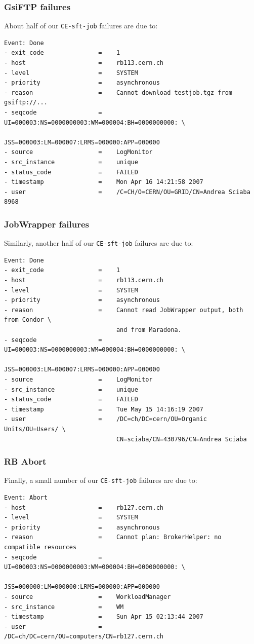 \documentclass{beamer}
\begin{document}
\begin{frame}[fragile]
\frametitle{GsiFTP failures}
About half of our {\tt CE-sft-job} failures are due to:
\scriptsize
\begin{verbatim}
Event: Done
- exit_code               =    1
- host                    =    rb113.cern.ch
- level                   =    SYSTEM
- priority                =    asynchronous
- reason                  =    Cannot download testjob.tgz from gsiftp://...
- seqcode                 =    UI=000003:NS=0000000003:WM=000004:BH=0000000000: \
                               JSS=000003:LM=000007:LRMS=000000:APP=000000
- source                  =    LogMonitor
- src_instance            =    unique
- status_code             =    FAILED
- timestamp               =    Mon Apr 16 14:21:58 2007
- user                    =    /C=CH/O=CERN/OU=GRID/CN=Andrea Sciaba 8968
\end{verbatim}
\end{frame}

\begin{frame}[fragile]
\frametitle{JobWrapper failures}
Similarly, another half of our {\tt CE-sft-job} failures are due to:
\scriptsize
\begin{verbatim}
Event: Done
- exit_code               =    1
- host                    =    rb113.cern.ch
- level                   =    SYSTEM
- priority                =    asynchronous
- reason                  =    Cannot read JobWrapper output, both from Condor \
                               and from Maradona.
- seqcode                 =    UI=000003:NS=0000000003:WM=000004:BH=0000000000: \
                               JSS=000003:LM=000007:LRMS=000000:APP=000000
- source                  =    LogMonitor
- src_instance            =    unique
- status_code             =    FAILED
- timestamp               =    Tue May 15 14:16:19 2007
- user                    =    /DC=ch/DC=cern/OU=Organic Units/OU=Users/ \
                               CN=sciaba/CN=430796/CN=Andrea Sciaba
\end{verbatim}
\end{frame}

\begin{frame}[fragile]
\frametitle{RB Abort}
Finally, a small number of our {\tt CE-sft-job} failures are due to:
\scriptsize
\begin{verbatim}
Event: Abort
- host                    =    rb127.cern.ch
- level                   =    SYSTEM
- priority                =    asynchronous
- reason                  =    Cannot plan: BrokerHelper: no compatible resources
- seqcode                 =    UI=000003:NS=0000000003:WM=000004:BH=0000000000: \
                               JSS=000000:LM=000000:LRMS=000000:APP=000000
- source                  =    WorkloadManager
- src_instance            =    WM
- timestamp               =    Sun Apr 15 02:13:44 2007
- user                    =    /DC=ch/DC=cern/OU=computers/CN=rb127.cern.ch
\end{verbatim}
\end{frame}
\end{document}
